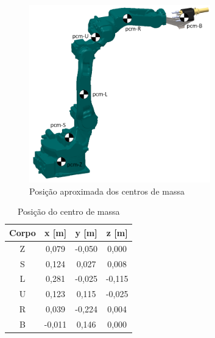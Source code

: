 \begin{figure}[h]
	\centering 
 	\includegraphics[width=0.7\textwidth]{figs/pcm_mh12}
 	\caption{Posição aproximada dos centros de massa}
 	\label{fig::pcm_mh12}
\end{figure}

%
\begin{table}[h] \centering
\caption{Posição do centro de massa}
\label{tab::resumo_cm}
\begin{tabular}{@{}cccc@{}}
\toprule
\textbf{Corpo} & \textbf{x [m]} & \textbf{y [m]} & \textbf{z [m]} \\ \midrule
Z              & 0,079      & -0,050     & 0,000      \\
S              & 0,124      & 0,027      & 0,008      \\
L              & 0,281      & -0,025     & -0,115     \\
U              & 0,123      & 0,115      & -0,025     \\
R              & 0,039      & -0,224     & 0,004      \\
B              & -0,011     & 0,146      & 0,000      \\ \bottomrule
\end{tabular}
\end{table}
%

